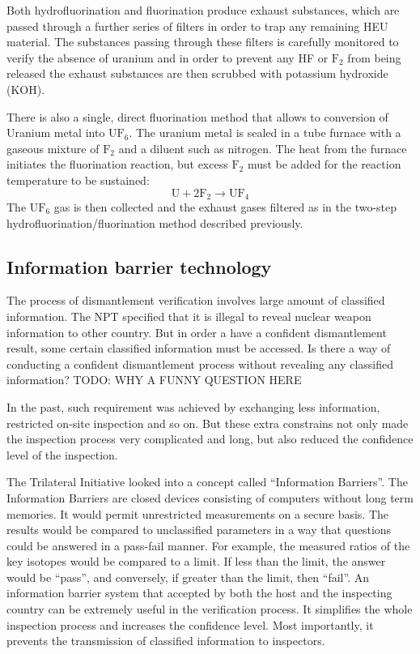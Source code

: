 \documentclass[twoside,titlepage,11pt,twocolumn,a4paper]{article}
\begin{document}
Both hydrofluorination and fluorination produce exhaust substances,
which are passed through a further series of filters in order to trap
any remaining HEU material. The substances passing through these
filters is carefully monitored to verify the absence of uranium and in
order to prevent any HF or \(\mathrm{F_2}\) from being released the
exhaust substances are then scrubbed with potassium hydroxide (KOH).

There is also a single, direct fluorination method that allows to
conversion of Uranium metal into \(\mathrm{UF_6}\). The uranium metal
is sealed in a tube furnace with a gaseous mixture of \(\mathrm{F_2}\)
and a diluent such as nitrogen. The heat from the furnace initiates
the fluorination reaction, but excess \(\mathrm{F_2}\) must be added
for the reaction temperature to be sustained:
\[ \mathrm{ U + 2F_2 \rightarrow UF_4 } \]
The \(\mathrm{UF_6}\) gas is then collected and the exhaust gases
filtered as in the two-step hydrofluorination/fluorination method
described previously. \citep{dilutingUranium}

\subsection{Information barrier technology}
The process of dismantlement verification involves large amount of
classified information. The NPT specified
that it is illegal to reveal nuclear weapon information to other
country. But in order a have a confident dismantlement result, some
certain classified information must be accessed. Is there a way of
conducting a confident dismantlement process without revealing any
classified information? TODO: WHY A FUNNY QUESTION HERE

In the past, such requirement was achieved by exchanging less
information, restricted on-site inspection and so on. But these extra
constrains not only made the inspection process very complicated and
long, but also reduced the confidence level of the inspection.

The Trilateral Initiative looked into a concept called ``Information
Barriers''. The Information Barriers are closed devices consisting of
computers without long term memories. It would permit unrestricted
measurements on a secure basis. The results would be compared to
unclassified parameters in a way that questions could be answered in a
pass-fail manner. \citep{SUW2005} For example, the measured ratios of
the key isotopes would be compared to a limit. If less than the limit,
the answer would be ``pass'', and conversely, if greater than the
limit, then ``fail''. An information barrier system that accepted by
both the host and the inspecting country can be extremely useful in
the verification process. It simplifies the whole inspection process
and increases the confidence level. Most importantly, it prevents the
transmission of classified information to inspectors.
\end{document}
